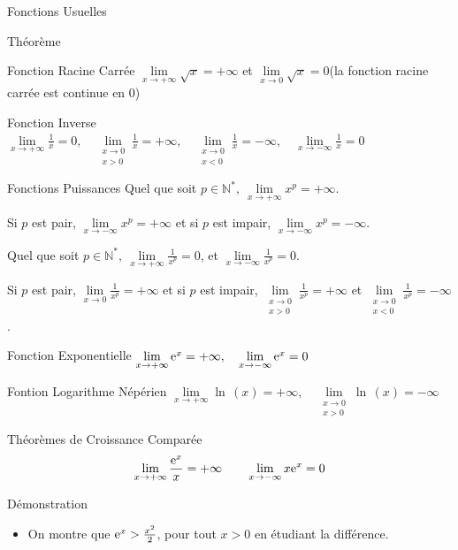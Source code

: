 \documentclass{coursbook}
\begin{document}
    \begin{Gpartie}{Fonctions Usuelles} 
        \begin{Spartie}{Théorème}
            \begin{SSpartie}{Fonction Racine Carrée} 
                $\lim\limits_{x\to+\infty}\sqrt{x}=+\infty$ et $\lim\limits_{x\to0}\sqrt{x}=0$\quad (la fonction racine carrée est continue en $0$)
            \end{SSpartie}
            \begin{SSpartie}{Fonction Inverse} 
                $\lim\limits_{x\to+\infty}\frac{1}{x}=0,\quad\lim\limits_{\substack{x\to 0 \\ x>0}}\frac{1}{x}=+\infty,\quad\lim\limits_{\substack{x\to 0 \\ x<0}}\frac{1}{x}=-\infty,\quad\lim\limits_{x\to-\infty}\frac{1}{x}=0$
            \end{SSpartie}
            \begin{SSpartie}{Fonctions Puissances} 
                Quel que soit $p\in\mathbb{N^*},~\lim\limits_{x\to+\infty}x^p=+\infty$.

                Si $p$ est pair, $\lim\limits_{x\to-\infty}x^p=+\infty$ et si $p$ est impair, $\lim\limits_{x\to-\infty}x^p=-\infty$.
                
                \vspace*{2ex}Quel que soit $p\in\mathbb{N^*},~\lim\limits_{x\to+\infty}\frac{1}{x^p}=0$, et $\lim\limits_{x\to-\infty}\frac{1}{x^p}=0$.

                Si $p$ est pair, $\lim\limits_{x\to0}\frac{1}{x^p}=+\infty$ et si $p$ est impair, $\lim\limits_{\substack{x\to0 \\ x>0}}\frac{1}{x^p}=+\infty$ et $\lim\limits_{\substack{x\to0 \\ x<0}}\frac{1}{x^p}=-\infty$.
            \end{SSpartie}
            \begin{SSpartie}{Fonction Exponentielle} 
                $\lim\limits_{x\to+\infty}\mathrm{e}^x=+\infty,\quad\lim\limits_{x\to-\infty}\mathrm{e}^x=0$
            \end{SSpartie}
            \begin{SSpartie}{Fontion Logarithme Népérien} 
                $\lim\limits_{x\to+\infty}\ln\,(x)=+\infty,\quad\lim\limits_{\substack{x\to0 \\ x>0}}\ln\,(x)=-\infty$
            \end{SSpartie}
        \end{Spartie}
        \vfill
        \pagebreak
        \begin{Spartie}{Théorèmes de Croissance Comparée} 
            \[\lim\limits_{x\to+\infty}\frac{\me^x}{x}=+\infty\qquad\lim\limits_{x\to-\infty}x\me^x=0\]
            \begin{SSpartie}{Démonstration} 
                \begin{itemize}
                    \item On montre que $\me^x>\frac{x^2}{2}$, pour tout $x>0$ en étudiant la différence.


\end{itemize}
\end{SSpartie}
\end{Spartie}
\end{Gpartie}
\end{document}
